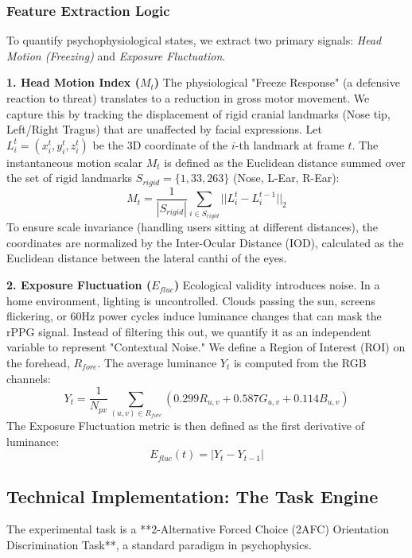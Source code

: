 \documentclass[journal]{IEEEtran}
\begin{document}
\subsubsection{Feature Extraction Logic}
To quantify psychophysiological states, we extract two primary signals: \textit{Head Motion (Freezing)} and \textit{Exposure Fluctuation}.

\textbf{1. Head Motion Index ($M_t$)}
The physiological "Freeze Response" (a defensive reaction to threat) translates to a reduction in gross motor movement.
We capture this by tracking the displacement of rigid cranial landmarks (Nose tip, Left/Right Tragus) that are unaffected by facial expressions.
Let $L_i^t = (x_i^t, y_i^t, z_i^t)$ be the 3D coordinate of the $i$-th landmark at frame $t$.
The instantaneous motion scalar $M_t$ is defined as the Euclidean distance summed over the set of rigid landmarks $S_{rigid} = \{1, 33, 263\}$ (Nose, L-Ear, R-Ear):
\begin{equation}
    M_t = \frac{1}{|S_{rigid}|} \sum_{i \in S_{rigid}} || L_i^t - L_i^{t-1} ||_2
\end{equation}
To ensure scale invariance (handling users sitting at different distances), the coordinates are normalized by the Inter-Ocular Distance (IOD),
calculated as the Euclidean distance between the lateral canthi of the eyes.

\textbf{2. Exposure Fluctuation ($E_{fluc}$)}
Ecological validity introduces noise. In a home environment, lighting is uncontrolled.
Clouds passing the sun, screens flickering, or 60Hz power cycles induce luminance changes that can mask the rPPG signal.
Instead of filtering this out, we quantify it as an independent variable to represent "Contextual Noise."
We define a Region of Interest (ROI) on the forehead, $R_{fore}$. The average luminance $Y_t$ is computed from the RGB channels:
\begin{equation}
    Y_t = \frac{1}{N_{px}} \sum_{(u,v) \in R_{fore}} (0.299R_{u,v} + 0.587G_{u,v} + 0.114B_{u,v})
\end{equation}
The Exposure Fluctuation metric is then defined as the first derivative of luminance:
\begin{equation}
    E_{fluc}(t) = | Y_t - Y_{t-1} |
\end{equation}

\subsection{Technical Implementation: The Task Engine}
The experimental task is a **2-Alternative Forced Choice (2AFC) Orientation Discrimination Task**, a standard paradigm in psychophysics.
\end{document}
